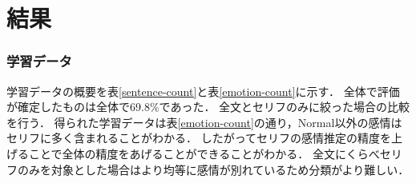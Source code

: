 \chapter{結果}

\subsection{学習データ}
\begin{table}[h]
 \centering
  \caption{学習データ(物語別)}
  \vspace{0.3\baselineskip}
  \label{sentence-count}
\end{table}

\begin{table}[h]
 \centering
  \caption{学習データ(感情別)}
  \vspace{0.3\baselineskip}
  \label{emotion-count}
\end{table}

学習データの概要を表\ref{sentence-count}と表\ref{emotion-count}に示す．
全体で評価が確定したものは全体で69.8\%であった．
全文とセリフのみに絞った場合の比較を行う．
得られた学習データは表\ref{emotion-count}の通り，Normal以外の感情はセリフに多く含まれることがわかる．
したがってセリフの感情推定の精度を上げることで全体の精度をあげることができることがわかる．
全文にくらべセリフのみを対象とした場合はより均等に感情が別れているため分類がより難しい．

